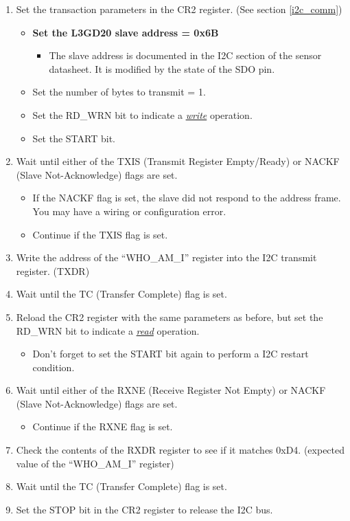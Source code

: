 \documentclass[openany,11pt,fleqn]{book} %
\begin{document}
\begin{enumerate}
    \item Set the transaction parameters in the CR2 register. (See section \ref{i2c_comm})
    \begin{itemize}
        \item \textbf{Set the L3GD20 slave address = 0x6B}
        \begin{itemize}
            \item The slave address is documented in the I2C section of the sensor datasheet. It is modified by the state of the SDO pin.
        \end{itemize}
        \item Set the number of bytes to transmit = 1.
        \item Set the RD\_WRN bit to indicate a \underline{\textit{write}} operation.
        \item Set the START bit.
    \end{itemize}
    \item Wait until either of the TXIS (Transmit Register Empty/Ready) or NACKF (Slave Not-Acknowledge) flags are set.
    \begin{itemize}
        \item If the NACKF flag is set, the slave did not respond to the address frame. You may have a wiring or configuration error. 
        \item Continue if the TXIS flag is set. 
    \end{itemize}
    \item Write the address of the ``WHO\_AM\_I'' register into the I2C transmit register. (TXDR)
    \item Wait until the TC (Transfer Complete) flag is set.
    \item Reload the CR2 register with the same parameters as before, but set the RD\_WRN bit to indicate a \underline{\textit{read}} operation.
    \begin{itemize}
        \item Don't forget to set the START bit again to perform a I2C restart condition.
    \end{itemize}
    \item Wait until either of the RXNE (Receive Register Not Empty) or NACKF (Slave Not-Acknowledge) flags are set.
    \begin{itemize}
        \item Continue if the RXNE flag is set. 
    \end{itemize}
    \item Check the contents of the RXDR register to see if it matches 0xD4. (expected value of the ``WHO\_AM\_I'' register) 
    \item Wait until the TC (Transfer Complete) flag is set.
    \item Set the STOP bit in the CR2 register to release the I2C bus.
\end{enumerate}
\end{document}
